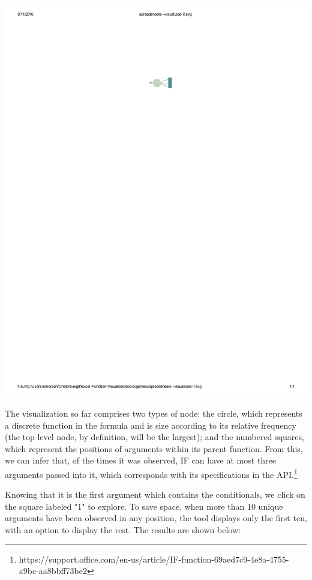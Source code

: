 \documentclass[conference]{IEEEtran}
\begin{document}
	\centerline{\includegraphics{start}}
	
	The visualization so far comprises two types of node: the circle, which
	represents a discrete function in the formula and is size according to its
	relative frequency (the top-level node, by definition, will be the largest);
	and the numbered squares, which represent the positions of arguments within its
	parent function. From this, we can infer that, of the times it was observed, IF
	can have at most three arguments passed into it, which corresponds with its
	specifications in the
	API.\footnote{https://support.office.com/en-us/article/IF-function-69aed7c9-4e8a-4755-a9bc-aa8bbff73be2} \par
	
	Knowing that it is the first argument which contains the conditionals, we click
	on the square labeled "1" to explore. To save space, when more than 10 unique
	arguments have been observed in any position, the tool displays only the first
	ten, with an option to display the rest. The results are shown below:
	
\end{document}
